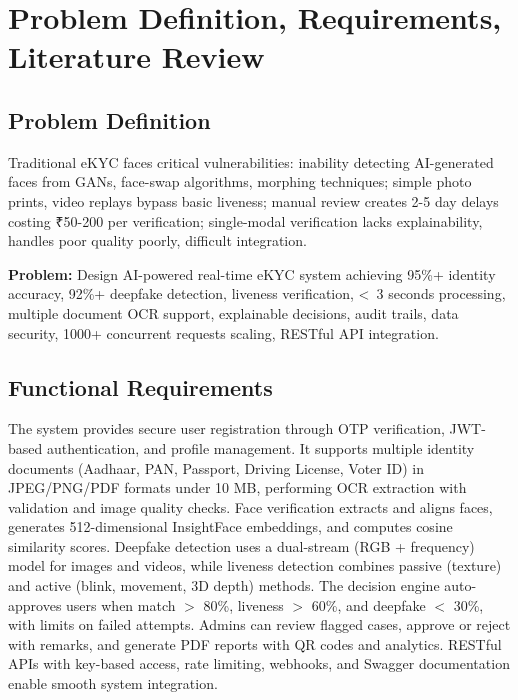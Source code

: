 \documentclass[12pt,a4paper]{article}
\begin{document}
\section{Problem Definition, Requirements, Literature Review}

\subsection{Problem Definition}

Traditional eKYC faces critical vulnerabilities: inability detecting AI-generated faces from GANs, face-swap algorithms, morphing techniques; simple photo prints, video replays bypass basic liveness; manual review creates 2-5 day delays costing ₹50-200 per verification; single-modal verification lacks explainability, handles poor quality poorly, difficult integration.

\textbf{Problem:} Design AI-powered real-time eKYC system achieving 95\%+ identity accuracy, 92\%+ deepfake detection, liveness verification, \textless\ 3 seconds processing, multiple document OCR support, explainable decisions, audit trails, data security, 1000+ concurrent requests scaling, RESTful API integration.

\subsection{Functional Requirements}

The system provides secure user registration through OTP verification, JWT-based authentication, and profile management. It supports multiple identity documents (Aadhaar, PAN, Passport, Driving License, Voter ID) in JPEG/PNG/PDF formats under 10 MB, performing OCR extraction with validation and image quality checks. Face verification extracts and aligns faces, generates 512-dimensional InsightFace embeddings, and computes cosine similarity scores. Deepfake detection uses a dual-stream (RGB + frequency) model for images and videos, while liveness detection combines passive (texture) and active (blink, movement, 3D depth) methods. The decision engine auto-approves users when match $>$ 80\%, liveness $>$ 60\%, and deepfake $<$ 30\%, with limits on failed attempts. Admins can review flagged cases, approve or reject with remarks, and generate PDF reports with QR codes and analytics. RESTful APIs with key-based access, rate limiting, webhooks, and Swagger documentation enable smooth system integration.
\end{document}
